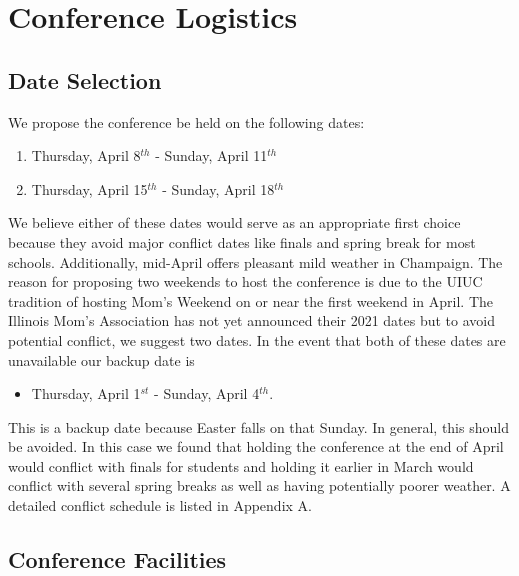 
\section{Conference Logistics}

\subsection{Date Selection}


We propose the conference be held on the following dates: 
\begin{enumerate}
	\item Thursday, April 8$^{th}$ - Sunday, April 11$^{th}$ 
	\item Thursday, April 15$^{th}$ - Sunday, April 18$^{th}$
\end{enumerate}
We believe either of these dates would serve as an appropriate first choice because they avoid major conflict dates like finals and spring break for most schools. Additionally, mid-April offers pleasant mild weather in Champaign. The reason for proposing two weekends to host the conference is due to the UIUC tradition of hosting Mom's Weekend on or near the first weekend in April. The Illinois Mom's Association has not yet announced their 2021 dates but to avoid potential conflict, we suggest two dates. In the event that both of these dates are unavailable our backup date is 
\begin{itemize}
	\item Thursday, April 1$^{st}$ - Sunday, April 4$^{th}$.  
\end{itemize}
This is a backup date because Easter falls on that Sunday. In general, this should be avoided. In this case we found that holding the conference at the end of April would conflict with finals for students and holding it earlier in March would conflict with several spring breaks as well as having potentially poorer weather. A detailed conflict schedule is listed in Appendix A. 

\subsection{Conference Facilities}



